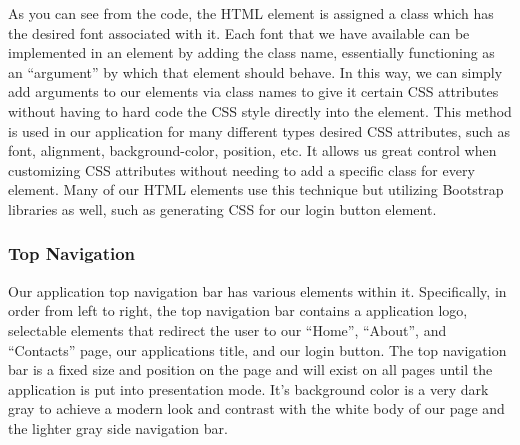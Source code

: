 \documentclass[letterpaper,10pt,serif,draftclsnofoot,onecolumn,compsoc,titlepage]{IEEEtran}
\begin{document}
	As you can see from the code, the HTML element is assigned a class which has the desired font associated with it. Each font that we have available can be 
	implemented in an element by adding the class name, essentially functioning as an ``argument'' by which that element should behave. In this way, we can simply
	add arguments to our elements via class names to give it certain CSS attributes without having to hard code the CSS style directly into the element. This method is used in our application for many
	different types desired CSS attributes, such as font, alignment, background-color, position, etc. It allows us great control when customizing CSS attributes without 
	needing to add a specific class for every element. Many of our HTML elements use this technique but utilizing Bootstrap libraries as well, such as generating CSS for 
	our login button element. 
	\subsubsection{Top Navigation}
	Our application top navigation bar has various elements within it. Specifically, in order from left to right, the top navigation bar contains a application logo, 
	selectable elements that redirect the user to our ``Home'', ``About'', and ``Contacts'' page, our applications title, and our login button. The top navigation bar 
	is a fixed size and position on the page and will exist on all pages until the application is put into presentation mode. It's background color is a very dark gray to achieve
	a modern look and contrast with the white body of our page and the lighter gray side navigation bar. 
	
\end{document}

